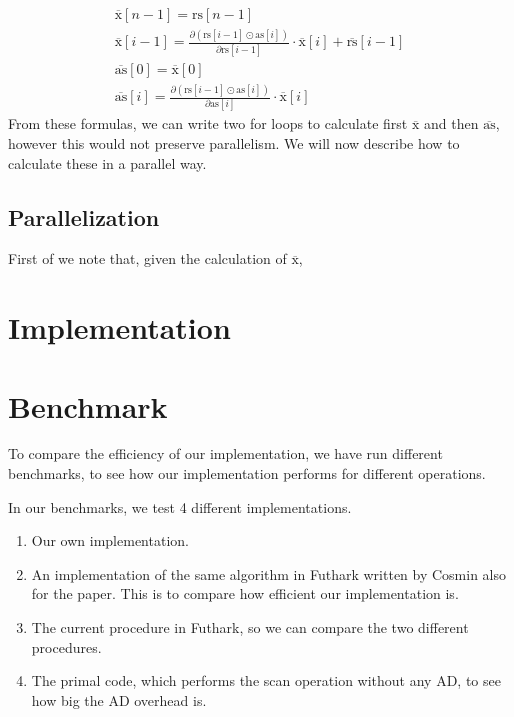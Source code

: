 \documentclass{article}
\newcommand{\ors}{\overline{\text{rs}}}
\newcommand{\rs}{\text{rs}}
\newcommand{\oas}{\overline{\text{as}}}
\newcommand{\xo}{\overline{\text{x}}}
\newcommand{\as}{\text{as}}
\begin{document}
\begin{align*}
	\xo [n-1] = \rs [n-1]      \\
	\xo [i-1] = \frac{\partial (\rs [i-1] \odot \as[i])}{\partial \rs[i-1]}
	\cdot \xo[i]   + \ors[i-1] \\
	\oas [0] = \xo[0]          \\
	\oas [i] = \frac{\partial (\rs [i-1] \odot \as[i])}{\partial \as[i]}
	\cdot
	\xo[i]
\end{align*}
From these formulas, we can write two for loops to calculate first \(\xo\)
and then \(\oas\),
however this would not preserve parallelism. We will now describe how to
calculate these in a parallel way.
\subsection{Parallelization}
First of we note that,
given the calculation of \(\xo\),
\section{Implementation}
\section{Benchmark}
To compare the efficiency of our implementation,
we have run different benchmarks,
to see how our implementation performs for different operations.

In our benchmarks, we test 4 different implementations.
\begin{enumerate}

	\item Our own implementation.
	\item An implementation of the same algorithm in Futhark written by Cosmin
	      also for the \cite{Futhark} paper.
	      This is to compare how efficient our implementation is.
	\item The current procedure in Futhark, so we can compare the two
	      different procedures.
	\item The primal code, which performs the scan operation without any AD,
	      to see how big the AD overhead is.

\end{enumerate}
\end{document}
